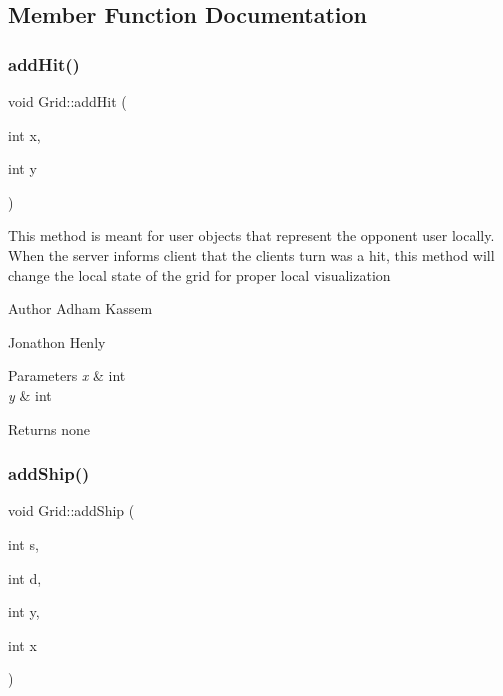 \subsection{Member Function Documentation}
\mbox{\label{classGrid_afffe02cb1a0511678d6fb20ff3db1236}} 
\subsubsection{\texorpdfstring{add\+Hit()}{addHit()}}
{\footnotesize\ttfamily void Grid\+::add\+Hit (\begin{DoxyParamCaption}\item[{int}]{x,  }\item[{int}]{y }\end{DoxyParamCaption})\hspace{0.3cm}{\ttfamily [inline]}}

This method is meant for user objects that represent the opponent user locally. When the server informs client that the clients turn was a hit, this method will change the local state of the grid for proper local visualization \begin{DoxyAuthor}{Author}
Adham Kassem 

Jonathon Henly 
\end{DoxyAuthor}

\begin{DoxyParams}{Parameters}
{\em x} & int \\
\hline
{\em y} & int \\
\hline
\end{DoxyParams}
\begin{DoxyReturn}{Returns}
none 
\end{DoxyReturn}
\mbox{\label{classGrid_a713d836d20af92af9f88849406267ea0}} 
\subsubsection{\texorpdfstring{add\+Ship()}{addShip()}}
{\footnotesize\ttfamily void Grid\+::add\+Ship (\begin{DoxyParamCaption}\item[{int}]{s,  }\item[{int}]{d,  }\item[{int}]{y,  }\item[{int}]{x }\end{DoxyParamCaption})\hspace{0.3cm}{\ttfamily [inline]}}

